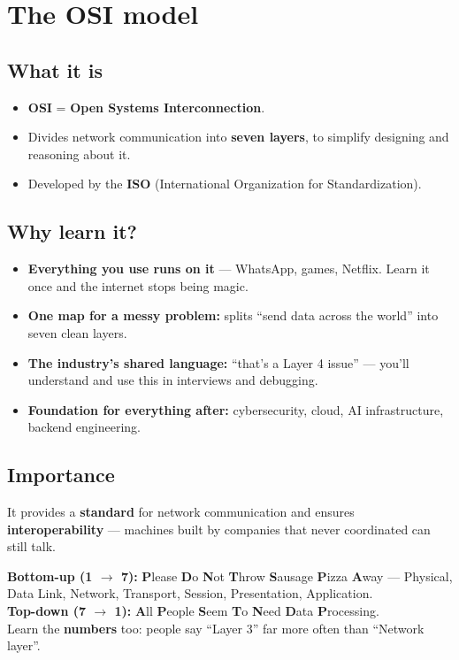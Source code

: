 \section{The OSI model}

\subsection{What it is}
\begin{itemize}
  \item \textbf{OSI} = \textbf{Open Systems Interconnection}.
  \item Divides network communication into \textbf{seven layers}, to simplify designing and reasoning about it.
  \item Developed by the \textbf{ISO} (International Organization for Standardization).
\end{itemize}

\subsection{Why learn it?}
\begin{itemize}
  \item \textbf{Everything you use runs on it} --- WhatsApp, games, Netflix. Learn it once and the internet stops being magic.
  \item \textbf{One map for a messy problem:} splits ``send data across the world'' into seven clean layers.
  \item \textbf{The industry's shared language:} ``that's a Layer 4 issue'' --- you'll understand and use this in interviews and debugging.
  \item \textbf{Foundation for everything after:} cybersecurity, cloud, AI infrastructure, backend engineering.
\end{itemize}

\subsection{Importance}
It provides a \textbf{standard} for network communication and ensures \textbf{interoperability} --- machines built by companies that never coordinated can still talk.

\begin{examtip}
\textbf{Bottom-up (1 $\to$ 7):} \textbf{P}lease \textbf{D}o \textbf{N}ot \textbf{T}hrow \textbf{S}ausage \textbf{P}izza \textbf{A}way --- Physical, Data Link, Network, Transport, Session, Presentation, Application.\\[2pt]
\textbf{Top-down (7 $\to$ 1):} \textbf{A}ll \textbf{P}eople \textbf{S}eem \textbf{T}o \textbf{N}eed \textbf{D}ata \textbf{P}rocessing.\\[2pt]
Learn the \textbf{numbers} too: people say ``Layer 3'' far more often than ``Network layer''.
\end{examtip}

